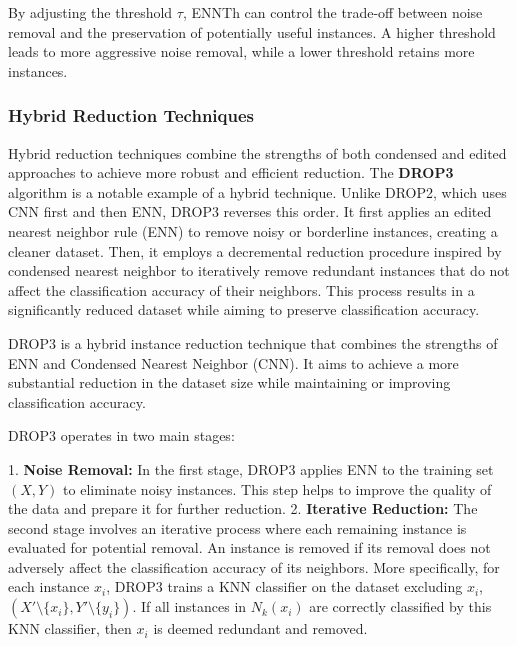 By adjusting the threshold $\tau$, ENNTh can control the trade-off between noise removal and the preservation of potentially useful instances. A higher threshold leads to more aggressive noise removal, while a lower threshold retains more instances.



\subsubsection{Hybrid Reduction Techniques}

Hybrid reduction techniques combine the strengths of both condensed and edited approaches to 
achieve more robust and efficient reduction. The \textbf{DROP3} algorithm \cite{wilson2000reduction} 
is a notable example of a hybrid technique. Unlike DROP2, which uses CNN first and then ENN, DROP3 reverses this order. 
It first applies an edited nearest neighbor rule (ENN) to remove noisy or borderline instances, creating a cleaner dataset.
Then, it employs a decremental reduction procedure inspired by condensed nearest neighbor to iteratively remove redundant
instances that do not affect the classification accuracy of their neighbors. This process results in a significantly 
reduced dataset while aiming to preserve classification accuracy.

DROP3 \cite{wilson2000reduction} is a hybrid instance reduction technique that combines the strengths of ENN and Condensed Nearest Neighbor (CNN). It aims to achieve a more substantial reduction in the dataset size while maintaining or improving classification accuracy.

DROP3 operates in two main stages:

1. \textbf{Noise Removal:} In the first stage, DROP3 applies ENN to the training set $(X, Y)$ to eliminate noisy instances. This step helps to improve the quality of the data and prepare it for further reduction.
2. \textbf{Iterative Reduction:} The second stage involves an iterative process where each remaining instance is evaluated for potential removal. An instance is removed if its removal does not adversely affect the classification accuracy of its neighbors.  More specifically, for each instance $x_i$, DROP3 trains a KNN classifier on the dataset excluding $x_i$, $(X' \setminus \{x_i\}, Y' \setminus \{y_i\})$. If all instances in $N_k(x_i)$ are correctly classified by this KNN classifier, then $x_i$ is deemed redundant and removed.

